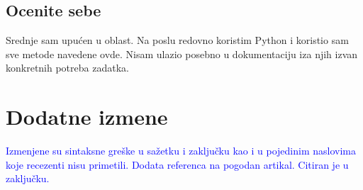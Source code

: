 \documentclass[a4paper]{report}
\newcommand{\odgovor}[1]{\textcolor{blue}{#1}}
\begin{document}
\section{Ocenite sebe}
Srednje sam upućen u oblast.
Na poslu redovno koristim Python i koristio sam sve metode navedene ovde. Nisam ulazio posebno u dokumentaciju iza njih izvan konkretnih potreba zadatka.


\chapter{Dodatne izmene}
\odgovor{Izmenjene su sintaksne greške u sažetku i zaključku kao i u pojedinim naslovima koje recezenti nisu primetili.}
\odgovor{Dodata referenca na pogodan artikal. Citiran je u zaključku.}
\end{document}
